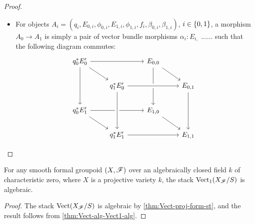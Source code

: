 \documentclass[11pt]{amsart}
\begin{document}
\begin{proof}
\begin{itemize}
\item For objects
$A_i = (q_i, E_{0, i}, \phi_{0, i}, E_{1, i}, \phi_{1, i}, f_i,
\beta_{0, i}, \beta_{1, i})$, $i \in \set{0, 1}$, a morphism
$A_0 \to A_1$ is simply a pair of vector bundle morphisms
$\alpha_{i} : E_{i, }$ ...... such that the following diagram commutes:
\[\begin{tikzcd}
  q_0^*E_0' \ar[rr] \ar[rd] \ar[dd] & &
  E_{0, 0} \ar[dd] \ar[rd] & \\
  & q_1^*E_{0}' \ar[rr, crossing over] & & E_{0, 1} \ar[dd] \\
  q_0^*E_1' \ar[rr] \ar[rd] & & E_{1, 0} \ar[rd] & \\
  & q_1^*E_1' \ar[rr] \ar[from=uu, crossing over] & & E_{1, 1}
\end{tikzcd}\]
\end{itemize}
\end{proof}

\begin{cor}
For any smooth formal groupoid $(X, \mathscr{F})$ over an algebraically closed field
$k$ of characteristic zero, where $X$ is a projective variety $k$,
the stack $\mathrm{Vect}_1(X_\mathscr{F}/S)$ is algebraic.
\end{cor}
\begin{proof}
The stack $\mathrm{Vect}(X_\mathscr{F}/S)$ is algebraic by \cref{thm:Vect-proj-form-st},
and the result follows from \cref{thm:Vect-alg-Vect1-alg}.
\end{proof}

\printbibliography
\end{document}
